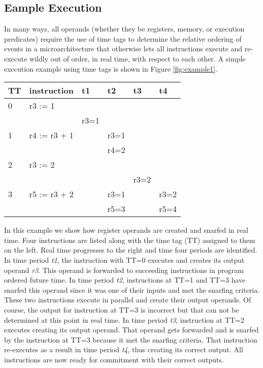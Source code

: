 \documentclass{book}
\begin{document}
\subsection{Eample Execution}
%
In many ways, all operands (whether they be registers, memory,
or execution predicates) require the use of time tags to
determine the relative ordering of events in a microarchitecture
that otherwise lets all instructions execute and re-execute
wildly out of order, in real time, with respect to each other.
A simple execution example using time tags 
is shown in Figure \ref{fig:example1}.
%
\begin{figure*}
\centering
\begin{tabular}{|l|l|l|l|l|l|}
\hline
TT&instruction&t1&t2&t3&t4\\
\hline 
\hline 
0&r3 := 1&&&~~~~&\\
&&r3=1&&&\\
\hline 
1&r4 := r3 + 1&&r3=1&&~~~~\\
&&&r4=2&&\\
\hline 
2&r3 := 2&&&&~~~~\\
&&&&r3=2&\\
\hline 
3&r5 := r3 + 2&&r3=1&&r3=2\\
&&&r5=3&&r5=4\\
\hline 
\end{tabular}
\caption{{\em Example Instruction Execution.} The time tags for sequential
program instructions are on the left.  Real time is shown advancing
along the top.  For each real time interval, input operands are shown
above any output operands.}
\label{fig:example1}
\end{figure*}
%
In this example we show how register operands are created and
snarfed in real time.
Four instructions are listed along with the time tag (TT) assigned to them
on the left.  Real time progresses to the right and time four periods
are identified.  In time period \textit{t1}, the instruction with 
TT=0 executes and creates its output operand \textit{r3}.
This operand is forwarded to succeeding instructions in program
ordered future time.  In time period \textit{t2}, instructions
at TT=1 and TT=3 have snarfed this operand since it was one of
their inputs and met the snarfing criteria.  
These two instructions execute in parallel and
create their output operands.  Of course, the output for
instruction at TT=3 is incorrect but that can not be determined
at this point in real time.  In time period \textit{t3},
instruction at TT=2 executes creating its output operand.
That operand gets forwarded and is snarfed by the instruction at
TT=3 because it met the snarfing criteria.  That instruction
re-executes as a result in time period \textit{t4}, thus
creating its correct output.  All instructions are now ready
for commitment with their correct outputs.
%
%
\end{document}
